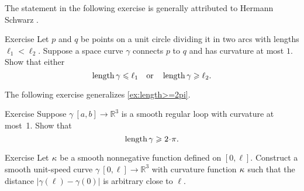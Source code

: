 The statement in the following exercise is generally attributed to Hermann Schwarz \cite{shur}.

\begin{thm}{Exercise}\label{ex:schwartz}
Let $p$ and $q$ be points on a unit circle dividing it in two arcs with lengths $\ell_1<\ell_2$.
Suppose a space curve $\gamma$ connects $p$ to $q$ and has curvature at most $1$.
Show that either
\[\mathop{\rm length}\nolimits \gamma\leqslant \ell_1
\quad\text{or}\quad
\mathop{\rm length}\nolimits \gamma\geqslant \ell_2.
\]
\end{thm}

The following exercise generalizes \ref{ex:length>=2pi}.

\begin{thm}{Exercise}\label{ex:loop}
Suppose $\gamma\:[a,b]\to \mathbb{R}^3$ is a smooth regular loop with curvature at most~1.
Show that 
\[\length\gamma\ge2\cdot\pi.\]

\end{thm}

\begin{thm}{Exercise}\label{ex:bow-upper}
Let $\kappa$ be a smooth nonnegative function defined on $[0,\ell]$.
Construct a smooth unit-speed curve $\gamma\:[0,\ell]\to\mathbb{R}^3$ with curvature function $\kappa$ such that the distance $|\gamma(\ell)-\gamma(0)|$ is arbitrary close to $\ell$.
\end{thm}

